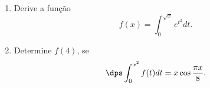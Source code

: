 \begin{frame}[label=def_integral]

\begin{small}

\begin{casa}
\begin{enumerate}[a]

\item Derive a função
$$f(x)=\int_0^{\sqrt{x}}e^{t^2}dt.$$

\item Determine $f(4)$, se $$\dps\int_0^{x^2}f(t)dt=x\cos\frac{\pi x}{8}.$$

\end{enumerate}


\end{casa}

\end{small}
\end{frame}
